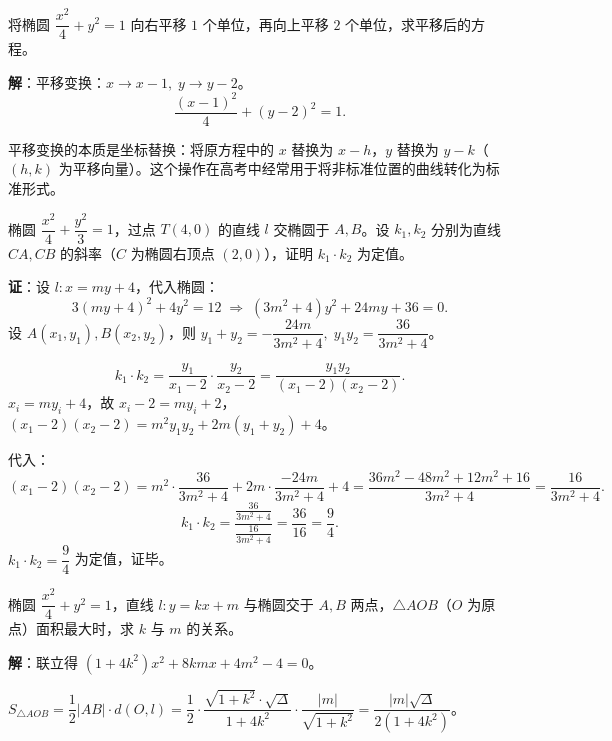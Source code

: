 \documentclass[12pt, a4paper]{ctexart}
\begin{document}
\vspace{6pt}

\begin{examplebox}[【例题10】平移变换简化方程]
将椭圆 $\dfrac{x^2}{4}+y^2=1$ 向右平移 $1$ 个单位，再向上平移 $2$ 个单位，求平移后的方程。
\end{examplebox}

\noindent\textbf{解}：平移变换：$x\to x-1,\;y\to y-2$。
\[
  \frac{(x-1)^2}{4}+(y-2)^2=1.
\]
\begin{tipbox}[变换思想]
平移变换的本质是坐标替换：将原方程中的 $x$ 替换为 $x-h$，$y$ 替换为 $y-k$（$(h,k)$ 为平移向量）。这个操作在高考中经常用于将非标准位置的曲线转化为标准形式。
\end{tipbox}

\vspace{6pt}

\begin{examplebox}
椭圆 $\dfrac{x^2}{4}+\dfrac{y^2}{3}=1$，过点 $T(4,0)$ 的直线 $l$ 交椭圆于 $A,B$。设 $k_1,k_2$ 分别为直线 $CA,CB$ 的斜率（$C$ 为椭圆右顶点 $(2,0)$），证明 $k_1\cdot k_2$ 为定值。
\end{examplebox}

\noindent\textbf{证}：设 $l:x=my+4$，代入椭圆：
\[
  3(my+4)^2+4y^2=12\;\Longrightarrow\;(3m^2+4)y^2+24my+36=0.
\]
设 $A(x_1,y_1),B(x_2,y_2)$，则 $y_1+y_2=-\dfrac{24m}{3m^2+4},\;y_1y_2=\dfrac{36}{3m^2+4}$。

\[
  k_1\cdot k_2=\frac{y_1}{x_1-2}\cdot\frac{y_2}{x_2-2}=\frac{y_1y_2}{(x_1-2)(x_2-2)}.
\]
$x_i=my_i+4$，故 $x_i-2=my_i+2$，$(x_1-2)(x_2-2)=m^2y_1y_2+2m(y_1+y_2)+4$。

代入：
\[
  (x_1-2)(x_2-2)=m^2\cdot\frac{36}{3m^2+4}+2m\cdot\frac{-24m}{3m^2+4}+4=\frac{36m^2-48m^2+12m^2+16}{3m^2+4}=\frac{16}{3m^2+4}.
\]
\[
  k_1\cdot k_2=\frac{\frac{36}{3m^2+4}}{\frac{16}{3m^2+4}}=\frac{36}{16}=\frac{9}{4}.
\]
$k_1\cdot k_2=\dfrac{9}{4}$ 为定值，证毕。

\vspace{6pt}

\begin{examplebox}[【例题12】综合——面积与弦长]
椭圆 $\dfrac{x^2}{4}+y^2=1$，直线 $l:y=kx+m$ 与椭圆交于 $A,B$ 两点，$\triangle AOB$（$O$ 为原点）面积最大时，求 $k$ 与 $m$ 的关系。
\end{examplebox}

\noindent\textbf{解}：联立得 $(1+4k^2)x^2+8kmx+4m^2-4=0$。

$S_{\triangle AOB}=\dfrac{1}{2}|AB|\cdot d(O,l)=\dfrac{1}{2}\cdot\dfrac{\sqrt{1+k^2}\cdot\sqrt{\Delta}}{1+4k^2}\cdot\dfrac{|m|}{\sqrt{1+k^2}}=\dfrac{|m|\sqrt{\Delta}}{2(1+4k^2)}$。
\end{document}
